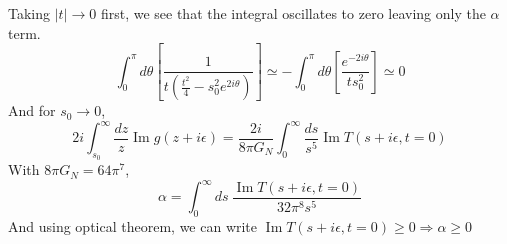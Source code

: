 ﻿\documentclass[12pt,a4paper]{article}
\begin{document}
Taking $|t|\rightarrow 0$ first, we see that the integral oscillates to zero leaving only the $\alpha$ term.
$$
\int_{0}^{\pi} d \theta\left[\frac{1}{t\left(\frac{t^{2}}{4}-s_{0}^{2} e^{2i \theta}\right)}\right]\simeq -\int_{0}^{\pi} d \theta\left[\frac{e^{-2i \theta}}{t s_{0}^{2} }\right]\simeq 0
$$
And for $s_{0}\rightarrow 0$,
$$
2 i \int_{s_{0}}^{\infty} \frac{d z}{z} \operatorname{Im} g(z+i \epsilon) =\frac{2 i}{8 \pi G_{N}} \int_{0}^{\infty} \frac{d s}{s^{5}} \operatorname{Im} T(s+i \epsilon, t=0)
$$
With $8 \pi G_{N}=64 \pi^{7}$,
$$
\alpha=\int_{0}^{\infty} ds\ \frac{\operatorname{Im} T(s+i \epsilon, t=0)}{32 \pi^{8} s^{5}}
$$
And using optical theorem, we can write $\operatorname{Im} T(s+i \epsilon, t=0)\geq 0 \Rightarrow \alpha \geq 0$
\end{document}
